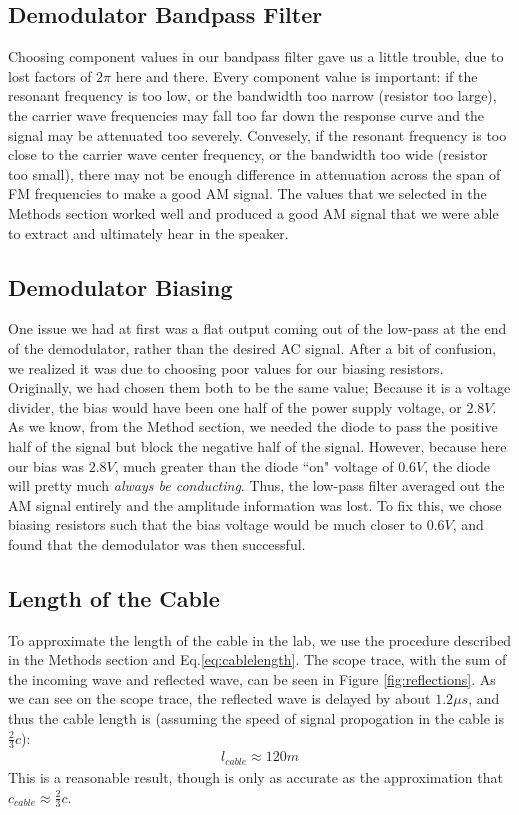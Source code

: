 \documentclass[12pt]{article}
\begin{document}
\subsection*{Demodulator Bandpass Filter}
Choosing component values in our bandpass filter gave us a little trouble, due to lost factors of $2\pi$ here and there. Every component value is important: if the resonant frequency is too low, or the bandwidth too narrow (resistor too large), the carrier wave frequencies may fall too far down the response curve and the signal may be attenuated too severely. Convesely, if the resonant frequency is too close to the carrier wave center frequency, or the bandwidth too wide (resistor too small), there may not be enough difference in attenuation across the span of FM frequencies to make a good AM signal. The values that we selected in the Methods section worked well and produced a good AM signal that we were able to extract and ultimately hear in the speaker.  
\subsection*{Demodulator Biasing}
One issue we had at first was a flat output coming out of the low-pass at the end of the demodulator, rather than the desired AC signal. After a bit of confusion, we realized it was due to choosing poor values for our biasing resistors. Originally, we had chosen them both to be the same value; Because it is a voltage divider, the bias would have been one half of the power supply voltage, or $2.8V$. As we know, from the Method section, we needed the diode to pass the positive half of the signal but block the negative half of the signal. However, because here our bias was $2.8V$, much greater than the diode ``on" voltage of $0.6V$, the diode will pretty much \textit{always be conducting}. Thus, the low-pass filter averaged out the AM signal entirely and the amplitude information was lost. To fix this, we chose biasing resistors such that the bias voltage would be much closer to $0.6V$, and found that the demodulator was then successful.

\subsection*{Length of the Cable}
To approximate the length of the cable in the lab, we use the procedure described in the Methods section and Eq.\ref{eq:cablelength}. The scope trace, with the sum of the incoming wave and reflected wave, can be seen in Figure \ref{fig:reflections}. As we can see on the scope trace, the reflected wave is delayed by about $1.2\mu s$, and thus the cable length is (assuming the speed of signal propogation in the cable is $\frac{2}{3}c$):
\begin{eqnarray}
l_{cable} \approx 120m \nonumber
\end{eqnarray}
This is a reasonable result, though is only as accurate as the approximation that $c_{cable} \approx \frac{2}{3}c$.
\end{document}
